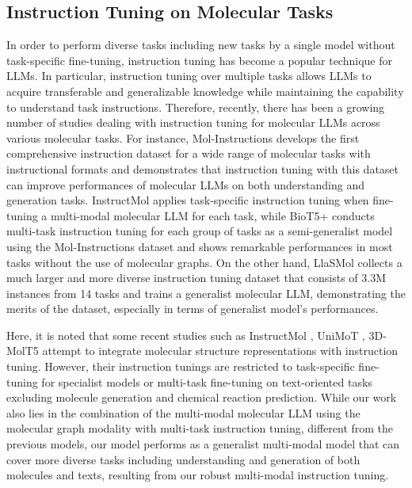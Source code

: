 \subsection{Instruction Tuning on Molecular Tasks}
In order to perform diverse tasks including new tasks by a single model without task-specific fine-tuning, instruction tuning has become a popular technique for LLMs. In particular, instruction tuning over multiple tasks allows LLMs to acquire transferable and generalizable knowledge while maintaining the capability to understand task instructions. Therefore, recently, there has been a growing number of studies dealing with instruction tuning for molecular LLMs across various molecular tasks. For instance, Mol-Instructions \cite{Fang2023MolInstructionsAL} develops the first comprehensive instruction dataset for a wide range of molecular tasks with instructional formats and demonstrates that instruction tuning with this dataset can improve performances of molecular LLMs on both understanding and generation tasks. InstructMol \cite{Cao2023InstructMolMI} applies task-specific instruction tuning when fine-tuning a multi-modal molecular LLM for each task, while BioT5+ \cite{Pei2024BioT5TG} conducts multi-task instruction tuning for each group of tasks as a semi-generalist model using the Mol-Instructions dataset and shows remarkable performances in most tasks without the use of molecular graphs. On the other hand, LlaSMol \cite{Yu2024LlaSMolAL} collects a much larger and more diverse instruction tuning dataset that consists of 3.3M instances from 14 tasks and trains a generalist molecular LLM, demonstrating the merits of the dataset, especially in terms of generalist model's performances. 

Here, it is noted that some recent studies such as InstructMol \cite{Cao2023InstructMolMI}, UniMoT \cite{zhang2024unimotunifiedmoleculetextlanguage}, 3D-MolT5 \cite{pei20243dmolt5unified3dmoleculetext} attempt to integrate molecular structure representations with instruction tuning. However, their instruction tunings are restricted to task-specific fine-tuning for specialist models or multi-task fine-tuning on text-oriented tasks excluding molecule generation and chemical reaction prediction. While our work also lies in the combination of the multi-modal molecular LLM using the molecular graph modality with multi-task instruction tuning, different from the previous models, our model performs as a generalist multi-modal model that can cover more diverse tasks including understanding and generation of both molecules and texts, resulting from our robust multi-modal instruction tuning.

